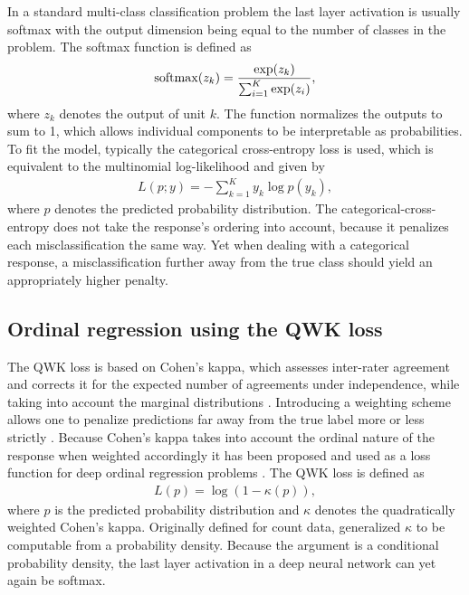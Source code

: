 \documentclass[article,nojss,shortnames]{jss}\usepackage[]{graphicx}\usepackage[]{color}
\begin{document}
In a standard multi-class classification problem the last layer activation is usually
softmax with the output dimension being equal to the number of classes in the
problem. The softmax function is defined as
\begin{align*}
  \operatorname{softmax}(z_k) = \frac{\exp(z_k)}{\sum_{i=1}^K \exp(z_i)},
\end{align*}
where $z_k$ denotes the output of unit $k$.
The function normalizes the outputs to sum to 1, which allows individual components
to be interpretable as probabilities. %
To fit the model, typically the categorical cross-entropy loss is used, which is
equivalent to the multinomial log-likelihood and given by
\begin{align*}
  L(p; y) = - \sum_{k=1}^K y_k \log p(y_k),
\end{align*}
where $p$ denotes the predicted probability distribution.
The categorical-cross-entropy does not take the response's ordering into account,
because it penalizes each misclassification the same way. Yet when dealing with
a categorical response, a misclassification further away from the true class
should yield an appropriately higher penalty.

\subsection{Ordinal regression using the QWK loss} \label{sec:qwk}

The QWK loss is based on Cohen's kappa, which assesses inter-rater agreement and
corrects it for the expected number of agreements under independence, while
taking into account the marginal distributions \citep{cohen1960coefficient}.
Introducing a weighting scheme allows one to penalize predictions far away from
the true label more or less strictly \citep{cohen1968weighted}.
Because Cohen's kappa takes into account the ordinal nature of the response when
weighted accordingly it has been proposed and used as a loss function for deep
ordinal regression problems
\citep{de2018weighted, de2019deep, vargas2019deep, vargas2020cumulative}.
The QWK loss is defined as
\begin{align*}
  L(p) = \log(1 - \kappa(p)),
\end{align*}
where $p$ is the predicted probability distribution and $\kappa$ denotes the
quadratically weighted Cohen's kappa.
Originally defined for count data, \citet{de2018weighted} generalized $\kappa$
to be computable from a probability density.
Because the argument is a conditional probability density, the last layer
activation in a deep neural network can yet again be softmax.
\end{document}
